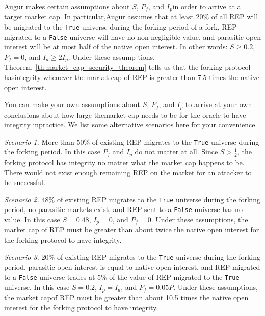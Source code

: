 \documentclass[12pt,floatfix,reprint,nofootinbib,amsmath,amssymb,epsfig,pre,floats,letterpaper,groupedaffiliation]{revtex4-1}
\theoremstyle{definition}
\theoremstyle{definition}
\begin{document}
Augur makes certain assumptions about $S$, $P_f$, and $I_p$\linebreak in order to arrive at a target market cap. In particular,\linebreak Augur assumes that at least 20\% of all REP will be migrated to the \texttt{True} universe during the forking period of a fork, REP migrated to a \texttt{False} universe will have no non-negligible value, and parasitic open interest will be at most half of the native open interest. In other words: $S \geq 0.2$, $P_f = 0$, and $I_a \geq 2I_p$. Under these assump-\linebreak tions, Theorem~\ref{th:market_cap_security_theorem} tells us that the forking protocol has\linebreak integrity whenever the market cap of REP is greater than 7.5 times the native open interest.

You can make your own assumptions about $S$, $P_f$, and $I_p$ to arrive at your own conclusions about how large the\linebreak market cap needs to be for the oracle to have integrity in\linebreak practice. We list some alternative scenarios here for your convenience.

\textit{Scenario 1.} More than 50\% of existing REP migrates to the \texttt{True} universe during the forking period. In this case $P_f$ and $I_p$ do not matter at all. Since $S > \frac{1}{2}$, the forking protocol has integrity no matter what the market cap happens to be. There would not exist enough remaining REP on the market for an attacker to be successful.

\textit{Scenario 2.} 48\% of existing REP migrates to the \texttt{True} universe during the forking period, no parasitic markets exist, and REP sent to a \texttt{False} universe has no value. In this case $S = 0.48$, $I_p = 0$, and $P_f = 0$. Under these assumptions, the market cap of REP must be greater than about twice the native open interest for the forking protocol to have integrity.

\textit{Scenario 3.} 20\% of existing REP migrates to the \texttt{True} universe during the forking period, parasitic open interest is equal to native open interest, and REP migrated to a \texttt{False} universe trades at 5\% of the value of REP migrated to the \texttt{True} universe. In this case $S = 0.2$, $I_p = I_a$, and $P_f = 0.05P$. Under these assumptions, the market cap\linebreak of REP must be greater than about 10.5 times the native open interest for the forking protocol to have integrity.
\end{document}
